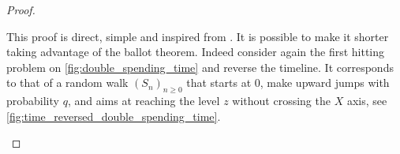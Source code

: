 \begin{proof}
\begin{remark}
This proof is direct, simple and inspired from \citet{Hofstad2008}. It is possible to make it shorter taking advantage of the ballot theorem. Indeed consider again the first hitting problem on \cref{fig:double_spending_time} and reverse the timeline. It corresponds to that of a random walk $(S_n)_{n\geq0}$ that starts at $0$, make upward jumps with probability $q$, and aims at reaching the level $z$ without crossing the $X$ axis, see \cref{fig:time_reversed_double_spending_time}.
\begin{figure}[ht!]
\begin{center}
\end{center}
\end{figure}
\end{remark}
\end{proof}
